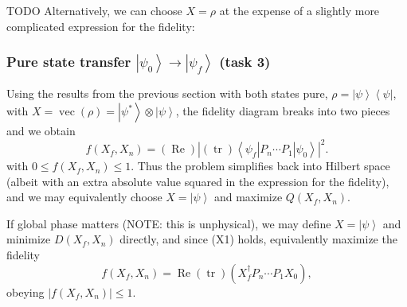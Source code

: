 \documentclass[aps, pra, a4paper, longbibliography]{revtex4}
\newcommand{\be}{\begin{equation}}
\newcommand{\ee}{\end{equation}}
\newcommand{\ket}[1]{\left| #1 \right \rangle}
\newcommand{\bra}[1]{\left \langle #1 \right|}
\newcommand{\ketbra}[2]{\left| #1 \right \rangle \left \langle #2 \right|}
\DeclareMathOperator{\tr}{tr}
\DeclareMathOperator{\re}{Re}
\DeclareMathOperator{\cvec}{vec}
\newcommand{\dd}[2]{\frac{\partial #1}{\partial #2}}
\begin{document}
TODO
Alternatively, we can choose $X = \rho$ at the expense of a slightly
more complicated expression for the fidelity:
\begin{comment}
\be
f(X_f, X_n)
= \frac{1}{P(X_f)} (\re) \tr(X_f^\dagger X_n)
= \frac{1}{P(X_f)} (\re) \tr(X_f^\dagger  P_n ... P_1 X_0 P_1^\dagger ... P_n^\dagger)
\ee

\be
X_i := \left(\prod_{j=1}^{i} P_j\right) X_0 \left(\prod_{j=1}^{i} P_j\right)^\dagger
\ee

\begin{align}
\dd{f(X_f, X_n)}{u(t_j)}
&= \re \left(\dd{g}{u(t_j)} \right)
= \frac{1}{P(X_f)} (\re) \tr \left(X_f \dd{X_n}{u(t_j)}\right)\\
&= \frac{1}{P(X_f)} \left(\tr \left(X_f P_n \cdots \dd{P_j}{u(t_j)} \cdots P_1 X_0 P^\dagger_1 \cdots P^\dagger_n\right)
+\tr\left(X_f P_n \cdots P_1 X_0 P^\dagger_1 \cdots \dd{P^\dagger(t_j)}{u(t_j)} \cdots P^\dagger_n\right)\right)\\
&= \frac{2}{P(X_f)} \re \tr\left(X_f P_n \cdots \dd{P_j}{u(t_j)} \cdots P_1 X_0 P^\dagger_1 \cdots P^\dagger_n\right).
\end{align}
NOTE: last line not in paper!
\end{comment}



\subsubsection{Pure state transfer $\ket{\psi_0} \to \ket{\psi_f}$ (task 3)}
\label{sec:closed-pure}

Using the results from the previous section with both states pure,
$\rho = \ketbra{\psi}{\psi}$, with
$X = \cvec(\rho) = \ket{\psi^*} \otimes \ket{\psi}$,
the fidelity diagram breaks into two pieces and
we obtain
\be
f(X_f, X_n)
= (\re) \left|(\tr) \bra{\psi_f}  P_n \cdots P_1 \ket{\psi_0} \right|^2.
\ee
with $0 \le f(X_f, X_n) \le 1$.
Thus the problem simplifies back into Hilbert space
(albeit with an extra absolute value squared in the expression for the fidelity), and we may equivalently
choose $X = \ket{\psi}$ and maximize $Q(X_f, X_n)$.




If global phase matters (NOTE: this is unphysical), we may define $X = \ket{\psi}$ and minimize
$D(X_f, X_n)$ directly, and since (X1) holds,
equivalently maximize the fidelity
\be
f(X_f, X_n)
= \re (\tr) \left(X_f^\dagger P_n \cdots P_1 X_0 \right),
\ee
obeying
$|f(X_f, X_n)| \le 1$.
\end{document}
